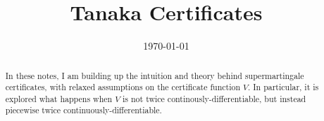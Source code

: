 \documentclass[10pt]{extarticle}
\title{Tanaka Certificates}
\date{\today}
\theoremstyle{remark}
\begin{document}
\maketitle

\begin{abstract}
  In these notes, I am building up the intuition and theory behind supermartingale certificates, with relaxed assumptions on the certificate function $V$. In particular, it is explored what happens when $V$ is not twice continously-differentiable, but instead piecewise twice continuously-differentiable.
\end{abstract}

\tableofcontents
\clearpage







\end{document}
